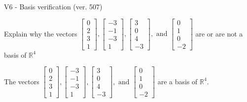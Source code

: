 \begin{exercise}
  \begin{exerciseTitle}V6 - Basis verification (ver. 507)\end{exerciseTitle}
  \begin{exerciseStatement}
    Explain why the vectors \(\left[\begin{array}{r}
0 \\
2 \\
3 \\
1
\end{array}\right] , \left[\begin{array}{r}
-3 \\
-1 \\
-3 \\
1
\end{array}\right] , \left[\begin{array}{r}
3 \\
0 \\
4 \\
-3
\end{array}\right] , \text{ and } \left[\begin{array}{r}
0 \\
1 \\
0 \\
-2
\end{array}\right]\) are or are not a basis of \(\mathbb{R}^4\)	


  \end{exerciseStatement}
  \begin{exerciseAnswer}
   The vectors \(\left[\begin{array}{r}
0 \\
2 \\
3 \\
1
\end{array}\right] , \left[\begin{array}{r}
-3 \\
-1 \\
-3 \\
1
\end{array}\right] , \left[\begin{array}{r}
3 \\
0 \\
4 \\
-3
\end{array}\right] , \text{ and } \left[\begin{array}{r}
0 \\
1 \\
0 \\
-2
\end{array}\right]\) 
  	 are  a basis of \(\mathbb{R}^4\).
  


  \end{exerciseAnswer}
\end{exercise}
